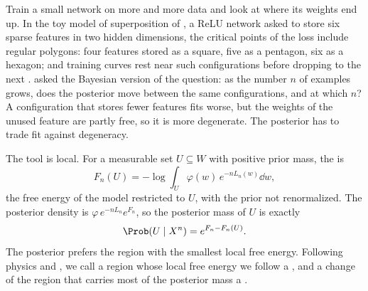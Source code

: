 \begin{refsection}
Train a small network on more and more data and look at where its weights end up. In the toy model of superposition of \textcite{ElhageEtAl2022}, a ReLU network asked to store six sparse features in two hidden dimensions, the critical points of the loss include regular polygons: four features stored as a square, five as a pentagon, six as a hexagon; and training curves rest near such configurations before dropping to the next \parencite{ChenEtAl2023}. \Textcite{ChenEtAl2023} asked the Bayesian version of the question: as the number $n$ of examples grows, does the posterior move between the same configurations, and at which $n$? A configuration that stores fewer features fits worse, but the weights of the unused feature are partly free, so it is more degenerate. The posterior has to trade fit against degeneracy.

The tool is local. For a measurable set $U\subseteq W$ with positive prior mass, the  is
\begin{equation}\label{eq:phases:local}
F_n(U)=-\log\int_U\varphi(w)\,e^{-nL_n(w)}\dd w ,
\end{equation}
the free energy of the model restricted to $U$, with the prior not renormalized. The posterior density is $\varphi\,e^{-nL_n}e^{F_n}$, so the posterior mass of $U$ is exactly
\begin{equation}\label{eq:phases:mass}
\Prob(U\mid X^n)=e^{F_n-F_n(U)} .
\end{equation}
The posterior prefers the region with the smallest local free energy. Following physics and \textcite{ChenEtAl2023}, we call a region whose local free energy we follow a , and a change of the region that carries most of the posterior mass a .


\end{refsection}

